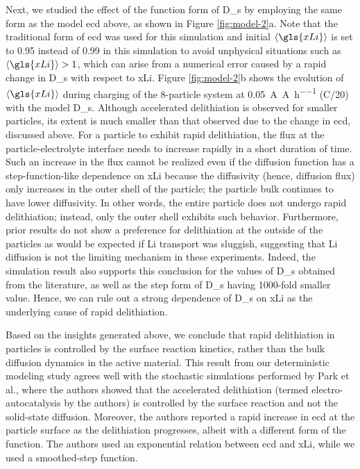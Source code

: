 \documentclass{WileyMSP-template}
\begin{document}
Next, we studied the effect of the function form of \gls{D_s} by
employing the same form as the model \gls{ecd} above, as shown in
Figure \ref{fig:model-2}a. Note that the traditional form of \gls{ecd}
was used for this simulation and initial $\left\langle \gls{xLi}
\right\rangle$ is set to \num{0.95} instead of \num{0.99} in this
simulation to avoid unphysical situations such as $\left\langle
\gls{xLi} \right\rangle > 1$, which can arise from a numerical error
caused by a rapid change in \gls{D_s} with respect to
\gls{xLi}. Figure \ref{fig:model-2}b shows the evolution of
$\left\langle \gls{xLi} \right\rangle$ during charging of the
8-particle system at \SI{0.05}{\ampere\per\ampere\per\hour} (C/20) with
the model \gls{D_s}. Although accelerated delithiation is observed for
smaller particles, its extent is much smaller than that observed due
to the change in \gls{ecd}, discussed above. For a particle to exhibit
rapid delithiation, the flux at the particle-electrolyte interface
needs to increase rapidly in a short duration of time. Such an
increase in the flux cannot be realized even if the diffusion function
has a step-function-like dependence on \gls{xLi} because the
diffusivity (hence, diffusion flux) only increases in the outer shell
of the particle; the particle bulk continues to have lower
diffusivity. In other words, the entire particle does not undergo
rapid delithiation; instead, only the outer shell exhibits such
behavior. Furthermore, prior results do not show a preference for
delithiation at the outside of the particles\cite{lu2021} as would be
expected if Li transport was sluggish, suggesting that Li diffusion is
not the limiting mechanism in these experiments. Indeed, the
simulation result also supports this conclusion for the values of
\gls{D_s} obtained from the literature, as well as the step form of
\gls{D_s} having 1000-fold smaller value. Hence, we can rule out a
strong dependence of \gls{D_s} on \gls{xLi} as the underlying cause of
rapid delithiation.

Based on the insights generated above, we conclude that rapid
delithiation in \nca{} particles is controlled by the surface reaction
kinetics, rather than the bulk  diffusion dynamics in the
active material. This result from our deterministic modeling study
agrees well with the stochastic simulations performed by Park et
al.\cite{chueh2021}, where the authors showed that the accelerated
delithiation (termed electro-autocatalysis by the authors) is
controlled by the surface reaction and not the solid-state
diffusion. Moreover, the authors reported a rapid increase in
\gls{ecd} at the \nca{} particle surface as the delithiation
progresses, albeit with a different form of the function. The authors
used an exponential relation between \gls{ecd} and \gls{xLi}, while we
used a smoothed-step function.
\end{document}

